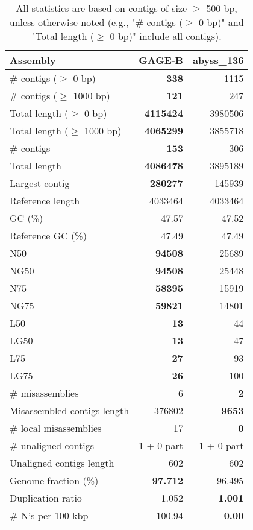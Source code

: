 \documentclass[12pt,a4paper]{article}
\begin{document}
\begin{table}[ht]
\begin{center}
\caption{All statistics are based on contigs of size $\geq$ 500 bp, unless otherwise noted (e.g., "\# contigs ($\geq$ 0 bp)" and "Total length ($\geq$ 0 bp)" include all contigs).}
\begin{tabular}{|l*{2}{|r}|}
\hline
Assembly & GAGE-B & abyss\_136 \\ \hline
\# contigs ($\geq$ 0 bp) & {\bf 338} & 1115 \\ \hline
\# contigs ($\geq$ 1000 bp) & {\bf 121} & 247 \\ \hline
Total length ($\geq$ 0 bp) & {\bf 4115424} & 3980506 \\ \hline
Total length ($\geq$ 1000 bp) & {\bf 4065299} & 3855718 \\ \hline
\# contigs & {\bf 153} & 306 \\ \hline
Total length & {\bf 4086478} & 3895189 \\ \hline
Largest contig & {\bf 280277} & 145939 \\ \hline
Reference length & 4033464 & 4033464 \\ \hline
GC (\%) & 47.57 & 47.52 \\ \hline
Reference GC (\%) & 47.49 & 47.49 \\ \hline
N50 & {\bf 94508} & 25689 \\ \hline
NG50 & {\bf 94508} & 25448 \\ \hline
N75 & {\bf 58395} & 15919 \\ \hline
NG75 & {\bf 59821} & 14801 \\ \hline
L50 & {\bf 13} & 44 \\ \hline
LG50 & {\bf 13} & 47 \\ \hline
L75 & {\bf 27} & 93 \\ \hline
LG75 & {\bf 26} & 100 \\ \hline
\# misassemblies & 6 & {\bf 2} \\ \hline
Misassembled contigs length & 376802 & {\bf 9653} \\ \hline
\# local misassemblies & 17 & {\bf 0} \\ \hline
\# unaligned contigs & 1 + 0 part & 1 + 0 part \\ \hline
Unaligned contigs length & 602 & 602 \\ \hline
Genome fraction (\%) & {\bf 97.712} & 96.495 \\ \hline
Duplication ratio & 1.052 & {\bf 1.001} \\ \hline
\# N's per 100 kbp & 100.94 & {\bf 0.00} \\ \hline

\end{tabular}
\end{center}
\end{table}
\end{document}
